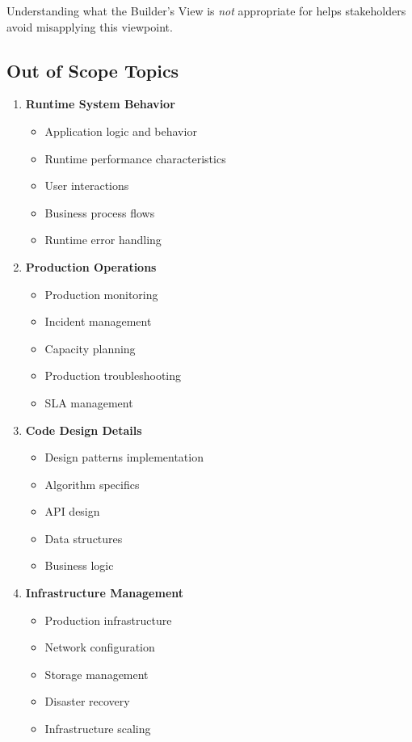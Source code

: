 \documentclass[11pt,letterpaper]{article}
\begin{document}
Understanding what the Builder's View is \emph{not} appropriate for helps stakeholders avoid misapplying this viewpoint.

\subsection{Out of Scope Topics}

\begin{enumerate}[label=\textbf{AC\arabic*:}, leftmargin=2.5em]
    \item \textbf{Runtime System Behavior}
    \begin{itemize}[nosep]
        \item Application logic and behavior
        \item Runtime performance characteristics
        \item User interactions
        \item Business process flows
        \item Runtime error handling
    \end{itemize}
    
    \item \textbf{Production Operations}
    \begin{itemize}[nosep]
        \item Production monitoring
        \item Incident management
        \item Capacity planning
        \item Production troubleshooting
        \item SLA management
    \end{itemize}
    
    \item \textbf{Code Design Details}
    \begin{itemize}[nosep]
        \item Design patterns implementation
        \item Algorithm specifics
        \item API design
        \item Data structures
        \item Business logic
    \end{itemize}
    
    \item \textbf{Infrastructure Management}
    \begin{itemize}[nosep]
        \item Production infrastructure
        \item Network configuration
        \item Storage management
        \item Disaster recovery
        \item Infrastructure scaling
    \end{itemize}
    

\end{enumerate}
\end{document}

